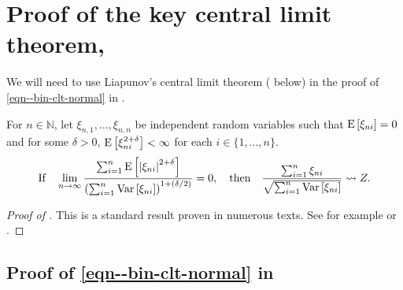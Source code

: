 
\section{Proof of the key central limit theorem,
\texorpdfstring{}{Theorem
\ref{thm--bin-clt-normal}}}
\label{sec--prf--thm--bin-clt-normal}

We will need to use Liapunov's central limit theorem (
below) in the proof of \eqref{eqn--bin-clt-normal} in
.

\begin{theorem}
\label{thm--liapunov-clt}
For \(n \in \mathbb{N}\), let \(\xi_{n, 1}, \dots, \xi_{n, n}\)
be independent random variables such that \(\mathrm{E} \left[ \xi_{n i} \right] = 0\)
and for some \(\delta > 0\), \(\mathrm{E} \left[ \xi_{n i}^{2 + \delta} \right] <
\infty\) for each \(i \in \{1, \dots, n\}\).
\begin{equation}
  \text{If} \quad \lim_{n \to \infty} \frac{\sum_{i = 1}^{n} \mathrm{E} \left[ \left|
  \xi_{n i} \right|^{2 + \delta} \right]}{\left( \sum_{i = 1}^{n} \mathrm{Var} \left[
  \xi_{n i} \right] \right)^{1 + (\delta / 2)}} = 0, \quad \text{then} \quad
  \frac{\sum_{i = 1}^{n} \xi_{n i}}{\sqrt{\sum_{i = 1}^{n} \mathrm{Var} \left[ \xi_{n i}
  \right]}} \rightsquigarrow Z.
  \label{eqn--liapunov-clt}
\end{equation}
\end{theorem}

\begin{proof}[Proof of ]
This is a standard result proven in numerous texts.
See for example \citet[Theorem 27.3, p. 362]{1995billingsleyProbabilityMeasure}
or \citet[Theorem 18 in Section 4 of Chapter III,
p. 51]{1984pollardConvergenceStochasticProcesses}.
\end{proof}

\subsection{Proof of
\texorpdfstring{\eqref{eqn--bin-clt-normal}}{(\ref{eqn--bin-clt-normal})}
in \texorpdfstring{}{Theorem
\ref{thm--bin-clt-normal}}}

